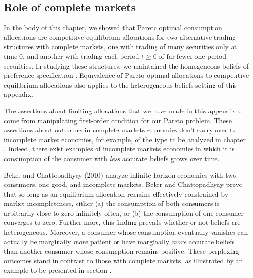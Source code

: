 \subsection{Role of complete markets}
In the body of this chapter, we showed that   Pareto optimal  consumption allocations are  competitive equilibrium allocations
for two alternative trading structures with complete markets, one with  trading of many securities only at time $0$, and another with trading each
period $t \geq 0$ of far fewer one-period securities.  In studying these structures, we maintained the
homogeneous beliefs  of preference specification .  Equivalence of  Pareto optimal allocations to competitive equilibrium allocations
 also applies to the heterogeneous beliefs setting of this appendix.

The assertions about limiting allocations that we have made in  this appendix  all come from manipulating  first-order condition  for our  Pareto problem. These assertions about  outcomes in complete markets economies don't carry over to
incomplete market economies, for example, of the type to be analyzed in chapter .   Indeed, there exist examples of incomplete markets
economies in which it is  consumption of the consumer with {\it less\/} accurate beliefs grows over time.

%
%
%
%
%





Beker and Chattopadhyay (2010) analyze infinite horizon
economies with two consumers, one good, and incomplete markets.
 Beker and Chattopadhyay prove that so long as an equilibrium allocation remains effectively constrained
 by market incompleteness, either (a) the consumption
of both consumers is arbitrarily close to zero infinitely often,
or (b) the consumption of one consumer
converges to zero. Further more, this finding  prevails  whether or not
beliefs are  heterogeneous. Moreover, a consumer whose consumption eventually
vanishes can actually be marginally {\it more}  patient or have  marginally {\it  more}
accurate beliefs than another consumer whose consumption remains positive.  These perplexing outcomes stand in contrast to
those  with complete markets, as illustrated
by an  example to be presented in section .

